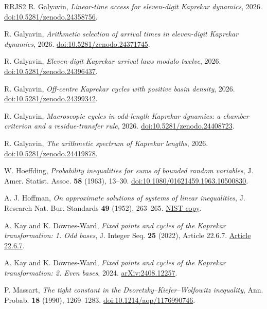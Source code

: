 \documentclass[11pt]{amsart}
\theoremstyle{definition}
\begin{document}
\begin{thebibliography}{RRJS2}
R. Galyavin, \emph{Linear-time access for eleven-digit Kaprekar dynamics}, 2026.
\href{https://doi.org/10.5281/zenodo.24358756}{doi:10.5281/zenodo.24358756}.

R. Galyavin, \emph{Arithmetic selection of arrival times in eleven-digit Kaprekar dynamics}, 2026.
\href{https://doi.org/10.5281/zenodo.24371745}{doi:10.5281/zenodo.24371745}.

R. Galyavin, \emph{Eleven-digit Kaprekar arrival laws modulo twelve}, 2026.
\href{https://doi.org/10.5281/zenodo.24396437}{doi:10.5281/zenodo.24396437}.

R. Galyavin, \emph{Off-centre Kaprekar cycles with positive basin density}, 2026.
\href{https://doi.org/10.5281/zenodo.24399342}{doi:10.5281/zenodo.24399342}.

R. Galyavin, \emph{Macroscopic cycles in odd-length Kaprekar dynamics: a chamber criterion and a residue-transfer rule}, 2026.
\href{https://doi.org/10.5281/zenodo.24408723}{doi:10.5281/zenodo.24408723}.

R. Galyavin, \emph{The arithmetic spectrum of Kaprekar lengths}, 2026.
\href{https://doi.org/10.5281/zenodo.24419878}{doi:10.5281/zenodo.24419878}.

W. Hoeffding, \emph{Probability inequalities for sums of bounded random variables},
J. Amer. Statist. Assoc. \textbf{58} (1963), 13--30.
\href{https://doi.org/10.1080/01621459.1963.10500830}{doi:10.1080/01621459.1963.10500830}.

A. J. Hoffman, \emph{On approximate solutions of systems of linear
inequalities}, J. Research Nat. Bur. Standards \textbf{49} (1952),
263--265.
\href{https://nvlpubs.nist.gov/nistpubs/jres/049/4/V49.N04.A05.pdf}{NIST copy}.

A. Kay and K. Downes-Ward, \emph{Fixed points and cycles of the Kaprekar
transformation: 1. Odd bases},
J. Integer Seq. \textbf{25} (2022), Article 22.6.7.
\href{https://cs.uwaterloo.ca/journals/JIS/VOL25/Kay/kay5.html}{Article 22.6.7}.

A. Kay and K. Downes-Ward, \emph{Fixed points and cycles of the Kaprekar
transformation: 2. Even bases}, 2024.
\href{https://arxiv.org/abs/2408.12257}{arXiv:2408.12257}.

P. Massart, \emph{The tight constant in the Dvoretzky--Kiefer--Wolfowitz inequality},
Ann. Probab. \textbf{18} (1990), 1269--1283.
\href{https://doi.org/10.1214/aop/1176990746}{doi:10.1214/aop/1176990746}.


\end{thebibliography}
\end{document}
